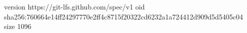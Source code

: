 version https://git-lfs.github.com/spec/v1
oid sha256:760664e14ff24297770e2ff4c8715f20322cd6232a1a724412d909d5d5405c04
size 1096
